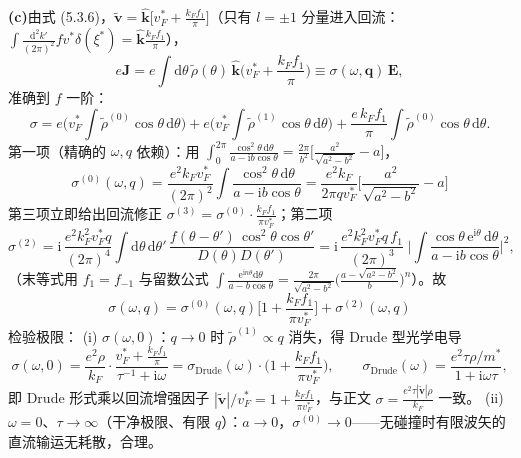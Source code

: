 \textbf{(c)}由式 (5.3.6)，$\tilde{\pmb{v}}=\hat{\pmb{k}}\big[v_F^{*}+\frac{k_Ff_1}{\pi}\big]$（只有 $l=\pm1$ 分量进入回流：$\int\frac{\mathrm{d}^{2}k'}{(2\pi)^{2}}fv^{*}\delta(\xi^{*})=\hat{\pmb{k}}\frac{k_Ff_1}{\pi}$），
\begin{equation*}
e\pmb{J}=e\int\mathrm{d}\theta\,\tilde\rho(\theta)\,\hat{\pmb{k}}\Big(v_F^{*}+\frac{k_Ff_1}{\pi}\Big)
\equiv\sigma(\omega,\pmb{q})\,\pmb{E},
\end{equation*}
准确到 $f$ 一阶：
\begin{equation*}
\sigma=e\Big(v_F^{*}\!\int\!\tilde\rho^{(0)}\cos\theta\,\mathrm{d}\theta\Big)
+e\Big(v_F^{*}\!\int\!\tilde\rho^{(1)}\cos\theta\,\mathrm{d}\theta\Big)
+\frac{e\,k_Ff_1}{\pi}\!\int\!\tilde\rho^{(0)}\cos\theta\,\mathrm{d}\theta .
\end{equation*}
第一项（精确的 $\omega,q$ 依赖）：用 $\int_0^{2\pi}\frac{\cos^{2}\theta\,\mathrm{d}\theta}{a-\mathrm{i}b\cos\theta}=\frac{2\pi}{b^{2}}\Big[\frac{a^{2}}{\sqrt{a^{2}-b^{2}}}-a\Big]$，
\begin{equation*}
\boxed{\;\sigma^{(0)}(\omega,q)=\frac{e^{2}k_Fv_F^{*}}{(2\pi)^{2}}\int\frac{\cos^{2}\theta\,\mathrm{d}\theta}{a-\mathrm{i}b\cos\theta}
=\frac{e^{2}k_F}{2\pi qv_F^{*}}\Big[\frac{a^{2}}{\sqrt{a^{2}-b^{2}}}-a\Big]\;}
\end{equation*}
第三项立即给出回流修正 $\sigma^{(3)}=\sigma^{(0)}\cdot\frac{k_Ff_1}{\pi v_F^{*}}$；第二项
\begin{equation*}
\sigma^{(2)}=\mathrm{i}\,\frac{e^{2}k_F^{2}v_F^{*}q}{(2\pi)^{4}}\!\int\!\mathrm{d}\theta\,\mathrm{d}\theta'\,
\frac{f(\theta-\theta')\,\cos^{2}\theta\cos\theta'}{D(\theta)D(\theta')}
=\mathrm{i}\,\frac{e^{2}k_F^{2}v_F^{*}q\,f_1}{(2\pi)^{3}}\;\Big|\!\int\!\frac{\cos\theta\,\mathrm{e}^{\mathrm{i}\theta}\,\mathrm{d}\theta}{a-\mathrm{i}b\cos\theta}\Big|^{2},
\end{equation*}
（末等式用 $f_1=f_{-1}$ 与留数公式 $\int\frac{\mathrm{e}^{\mathrm{i}n\theta}\mathrm{d}\theta}{a-b\cos\theta}=\frac{2\pi}{\sqrt{a^{2}-b^{2}}}\big(\frac{a-\sqrt{a^{2}-b^{2}}}{b}\big)^{n}$）。故
\begin{equation*}
\boxed{\;\sigma(\omega,q)=\sigma^{(0)}(\omega,q)\Big[1+\frac{k_Ff_1}{\pi v_F^{*}}\Big]+\sigma^{(2)}(\omega,q)\;}
\end{equation*}
检验极限：
(i) $\sigma(\omega,0)$：$q\to0$ 时 $\tilde\rho^{(1)}\propto q$ 消失，得 Drude 型光学电导
\begin{equation*}
\sigma(\omega,0)=\frac{e^{2}\rho}{k_F}\cdot\frac{v_F^{*}+\frac{k_Ff_1}{\pi}}{\tau^{-1}+\mathrm{i}\omega}
=\sigma_{\mathrm{Drude}}(\omega)\cdot\Big(1+\frac{k_Ff_1}{\pi v_F^{*}}\Big),
\qquad
\sigma_{\mathrm{Drude}}(\omega)=\frac{e^{2}\tau\rho/m^{*}}{1+\mathrm{i}\omega\tau},
\end{equation*}
即 Drude 形式乘以回流增强因子 $|\tilde{\pmb v}|/v_F^{*}=1+\frac{k_Ff_1}{\pi v_F^{*}}$，与正文 $\sigma=\frac{e^{2}\tau|\tilde{\pmb v}|\rho}{k_F}$ 一致。
(ii) $\omega=0$、$\tau\to\infty$（干净极限、有限 $q$）：$a\to0$，$\sigma^{(0)}\to0$——无碰撞时有限波矢的直流输运无耗散，合理。

